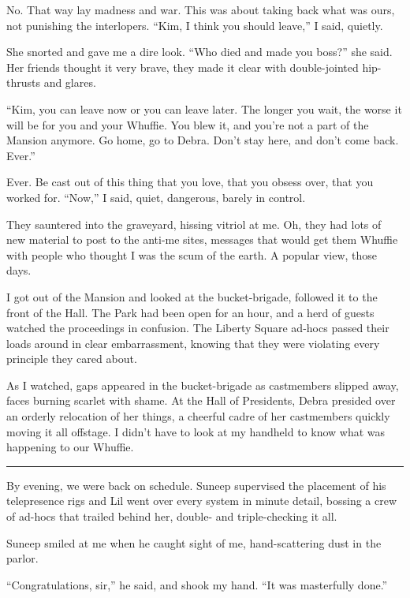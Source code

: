No. That way lay madness and war. This was about taking back what
was ours, not punishing the interlopers. “Kim, I think you should
leave,” I said, quietly.

She snorted and gave me a dire look. “Who died and made you boss?”
she said. Her friends thought it very brave, they made it clear
with double-jointed hip-thrusts and glares.

“Kim, you can leave now or you can leave later. The longer you
wait, the worse it will be for you and your Whuffie. You blew it,
and you're not a part of the Mansion anymore. Go home, go to Debra.
Don't stay here, and don't come back. Ever.”

Ever. Be cast out of this thing that you love, that you obsess
over, that you worked for. “Now,” I said, quiet, dangerous, barely
in control.

They sauntered into the graveyard, hissing vitriol at me. Oh, they
had lots of new material to post to the anti-me sites, messages
that would get them Whuffie with people who thought I was the scum
of the earth. A popular view, those days.

I got out of the Mansion and looked at the bucket-brigade, followed
it to the front of the Hall. The Park had been open for an hour,
and a herd of guests watched the proceedings in confusion. The
Liberty Square ad-hocs passed their loads around in clear
embarrassment, knowing that they were violating every principle
they cared about.

As I watched, gaps appeared in the bucket-brigade as castmembers
slipped away, faces burning scarlet with shame. At the Hall of
Presidents, Debra presided over an orderly relocation of her
things, a cheerful cadre of her castmembers quickly moving it all
offstage. I didn't have to look at my handheld to know what was
happening to our Whuffie.

\begin{center}\rule{1in}{0.4pt}\end{center}

By evening, we were back on schedule. Suneep supervised the
placement of his telepresence rigs and Lil went over every system
in minute detail, bossing a crew of ad-hocs that trailed behind
her, double- and triple-checking it all.

Suneep smiled at me when he caught sight of me, hand-scattering
dust in the parlor.

“Congratulations, sir,” he said, and shook my hand. “It was
masterfully done.”

